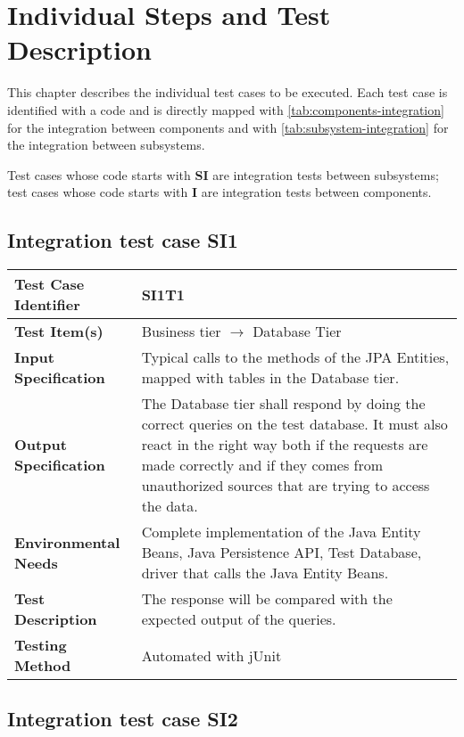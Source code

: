 \chapter{Individual Steps and Test Description}
\label{chap:individual-steps}

This chapter describes the individual test cases to be executed.
Each test case is identified with a code and is directly mapped with \autoref{tab:components-integration} for the integration between components and with \autoref{tab:subsystem-integration} for the integration between subsystems.

Test cases whose code starts with \textbf{SI} are integration tests between subsystems; test cases whose code starts with \textbf{I} are integration tests between components.

\section{Integration test case SI1}

\begin{tabular}{l p{}}
    \hline
    \textbf{Test Case Identifier} & SI1T1\\
    \hline
    \textbf{Test Item(s)} & Business tier $\rightarrow$ Database Tier\\
    \hline
    \textbf{Input Specification} & Typical calls to the methods of the JPA Entities, mapped with tables in the Database tier.\\
    \hline
    \textbf{Output Specification} & The Database tier shall respond by doing the correct queries on the test database. It must also react in the right way both if the requests are made correctly and if they comes from unauthorized sources that are trying to access the data.\\
    \hline
    \textbf{Environmental Needs} & Complete implementation of the Java Entity Beans, Java Persistence API, Test Database, driver that calls the Java Entity Beans. \\
    \hline
    \textbf{Test Description} & The response will be compared with the expected output of the queries.\\
    \hline
    \textbf{Testing Method} & Automated with jUnit \\
    \hline
\end{tabular}

\vspace{2em}

\section{Integration test case SI2}

